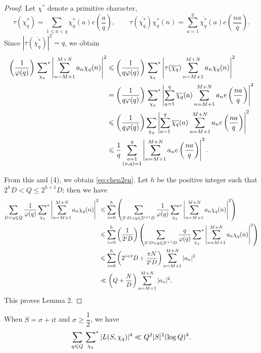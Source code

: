 \begin{proof}
Let $\chi^*$ denote a primitive character,
\[
\tau(\chi_q^*)=\sum_{1\leqslant a<q}\chi_q^*(a)e\left(\frac{a}{q}\right),
\qquad
\tau(\overline{\chi_q^*})\chi_q^*(n)
=\sum_{a=1}^{q}\overline{\chi_q^*}(a)e\left(\frac{na}{q}\right).
\]
Since $|\tau(\overline{\chi_q^*})|^2=q$, we obtain
\begin{align*}
\left(\frac{1}{\varphi(q)}\right)
\sideset{}{^*}\sum_{\chi_q}
\left|\sum_{n=M+1}^{M+N}a_n\chi_q(n)\right|^2
&\leqslant\left(\frac{1}{q\varphi(q)}\right)
\sideset{}{^*}\sum_{\chi_q}
\left|\tau(\overline{\chi_q})\sum_{n=M+1}^{M+N}a_n\chi_q(n)\right|^2\\
&=\left(\frac{1}{q\varphi(q)}\right)
\sideset{}{^*}\sum_{\chi_q}
\left|\sum_{a=1}^{q}\overline{\chi_q}(a)
\sum_{n=M+1}^{M+N}a_n e\left(\frac{na}{q}\right)\right|^2\\
&\leqslant\left(\frac{1}{q\varphi(q)}\right)
\sum_{\chi_q}
\left|\sum_{a=1}^{q}\overline{\chi_q}(a)
\sum_{n=M+1}^{M+N}a_n e\left(\frac{na}{q}\right)\right|^2\\
&\leqslant\frac{1}{q}\sum_{\substack{a=1\\(a,q)=1}}^{q}
\left|\sum_{n=M+1}^{M+N}a_n e\left(\frac{na}{q}\right)\right|^2.
\end{align*}

From this and (4), we obtain \eqref{eq:chen2en}. Let $h$ be the positive integer such that $2^hD<Q\leqslant2^{h+1}D$; then we have
\begin{align*}
\sum_{D<q\leqslant Q}\frac{1}{\varphi(q)}
\sideset{}{^*}\sum_{\chi_q}
\left|\sum_{n=M+1}^{M+N}a_n\chi_q(n)\right|^2
&\leqslant\sum_{i=0}^{h}\left(
\sum_{2^iD<q\leqslant2^{i+1}D}\frac{1}{\varphi(q)}
\sideset{}{^*}\sum_{\chi_q}
\left|\sum_{n=M+1}^{M+N}a_n\chi_q(n)\right|^2\right)\\
&\leqslant\sum_{i=0}^{h}\left(\frac{1}{2^iD}\right)
\left(\sum_{2^iD<q\leqslant2^{i+1}D}\frac{q}{\varphi(q)}
\sideset{}{^*}\sum_{\chi_q}
\left|\sum_{n=M+1}^{M+N}a_n\chi_q(n)\right|^2\right)\\
&\leqslant\sum_{i=0}^{h}\left(2^{i+2}D+\frac{\pi N}{2^iD}\right)
\sum_{n=M+1}^{M+N}|a_n|^2\\
&\ll\left(Q+\frac{N}{D}\right)\sum_{n=M+1}^{M+N}|a_n|^2.
\end{align*}
This proves Lemma 2.
\end{proof}

\begin{lemma}
When $S=\sigma+it$ and $\sigma\geqslant\dfrac12$, we have
\[
\sum_{q\leqslant Q}\sideset{}{^*}\sum_{\chi_q}|L(S,\chi_q)|^4
\ll Q^2|S|^2(\log Q)^4.
\]
\end{lemma}

